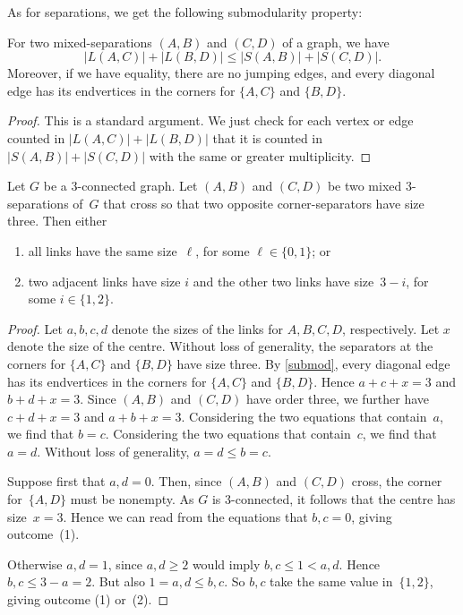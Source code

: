 \documentclass{aic}
\theoremstyle{plain}
\theoremstyle{definition}
\theoremstyle{plain}
\theoremstyle{plain}
\renewcommand{\leq}{\leqslant}
\renewcommand{\le}{\leqslant}
\renewcommand{\ge}{\geqslant}
\begin{document}
As for separations, we get the following submodularity property:

\begin{lem}\label{submod}
For two mixed-separations $(A,B)$ and $(C,D)$ of a graph, we have
\[
  |L(A,C)|+|L(B,D)|\leq |S(A,B)|+|S(C,D)|.
\]
Moreover, if we have equality, there are no jumping edges, and every diagonal edge has its 
endvertices in the corners for $\{A,C\}$ and $\{B,D\}$.  
\end{lem}

\begin{proof}
This is a standard argument. We just check for each vertex or edge counted in $|L(A,C)|+|L(B,D)|$ 
that it is counted in $|S(A,B)|+|S(C,D)|$ with the same or greater multiplicity.
\end{proof}



\begin{lem}\label{magicLemmaStep1}
Let $G$ be a 3-connected graph.
Let $(A,B)$ and $(C,D)$ be two mixed 3-separations of~$G$ that cross so that two opposite corner-separators have size three.
Then either
\begin{enumerate}
    \item all links have the same size~$\ell$, for some $\ell\in\{0,1\}$; or
    \item two adjacent links have size $i$ and the other two links have size~$3-i$, for some $i\in\{1,2\}$.
\end{enumerate}
\end{lem}
\begin{proof}
Let $a,b,c,d$ denote the sizes of the links for $A,B,C,D$, respectively.
Let $x$ denote the size of the centre.
Without loss of generality, the separators at the corners for $\{A,C\}$ and $\{B,D\}$ have size three.
By \autoref{submod}, every diagonal edge has its endvertices in the corners for $\{A,C\}$ and $\{B,D\}$.
Hence $a+c+x=3$ and $b+d+x=3$.
Since $(A,B)$ and $(C,D)$ have order three, we further have $c+d+x=3$ and $a+b+x=3$.
Considering the two equations that contain~$a$, we find that $b=c$.
Considering the two equations that contain~$c$, we find that $a=d$.
Without loss of generality, $a=d\le b=c$.

Suppose first that $a,d=0$.
Then, since $(A,B)$ and $(C,D)$ cross, the corner for~$\{A,D\}$ must be nonempty.
As $G$ is 3-connected, it follows that the centre has size~$x=3$.
Hence we can read from the equations that $b,c=0$, giving outcome~(1).

Otherwise $a,d=1$, since $a,d\ge 2$ would imply $b,c\le 1<a,d$.
Hence $b,c\le 3-a=2$.
But also $1=a,d\le b,c$.
So $b,c$ take the same value in~$\{1,2\}$, giving outcome (1) or~(2).
\end{proof}
\end{document}
